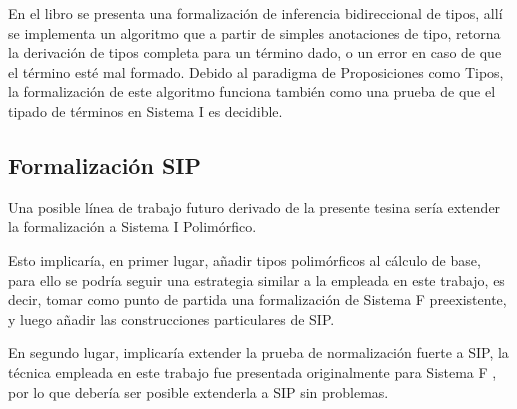 En el libro  \cite{plfa} se presenta una formalización de inferencia bidireccional de tipos, allí se implementa un algoritmo que a partir de simples anotaciones de tipo, retorna la derivación de tipos completa para un término dado, o un error en caso de que el término esté mal formado.
Debido al paradigma de Proposiciones como Tipos, la formalización de este algoritmo funciona también como una prueba de que el tipado de términos en Sistema I es decidible.

\subsection{Formalización SIP}

Una posible línea de trabajo futuro derivado de la presente tesina sería extender la formalización a Sistema I Polimórfico.

Esto implicaría, en primer lugar, añadir tipos polimórficos al cálculo de base, para ello se podría seguir una estrategia similar a la empleada en este trabajo, es decir, tomar como punto de partida una formalización de Sistema F preexistente, y luego añadir las construcciones particulares de SIP.

En segundo lugar, implicaría extender la prueba de normalización fuerte a SIP, la técnica empleada en este trabajo fue presentada originalmente para Sistema F \cite{Schafer}, por lo que debería ser posible extenderla a SIP sin problemas.